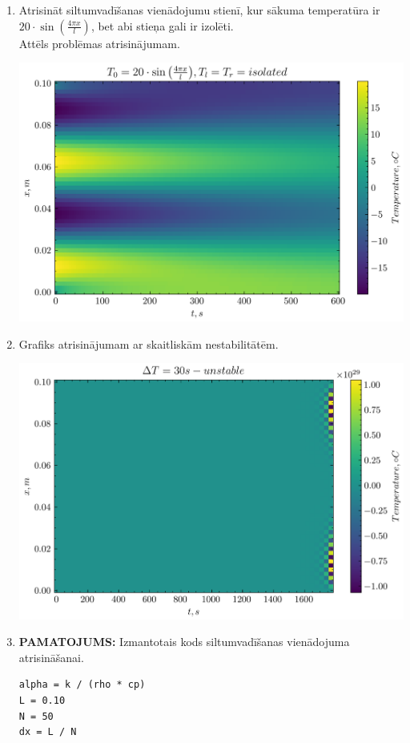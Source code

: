 \documentclass[12pt]{article}
\begin{document}
\begin{enumerate}
\begin{center}
\end{center}
  \item Atrisināt siltumvadīšanas vienādojumu stienī, kur sākuma temperatūra ir $20\cdot \sin{\left(\frac{4\pi x}{l}\right)}$, bet abi stieņa gali ir izolēti. \\ Attēls problēmas atrisinājumam.
\begin{center}
\includegraphics[]{2.3.png}
\end{center}
  \item Grafiks atrisinājumam ar skaitliskām nestabilitātēm.
\begin{center}
\includegraphics[]{2.4.png}
\end{center}
  \item \textbf{PAMATOJUMS:} Izmantotais kods siltumvadīšanas vienādojuma atrisināšanai.
  \begin{verbatim}
alpha = k / (rho * cp)
L = 0.10
N = 50
dx = L / N


\end{verbatim}
\end{enumerate}
\end{document}
